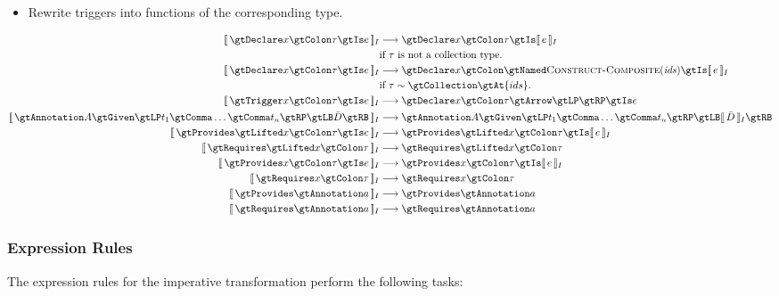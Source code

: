\documentclass[10pt]{article}
\begin{document}
\begin{itemize}
    \item Rewrite triggers into functions of the corresponding type.
\end{itemize}
%
\begin{adjustwidth}{-0.5in}{-0.5in}\begin{align*}
    \eqI{\gtDeclare x \gtColon \tau \gtIs e}
        {\gtDeclare x \gtColon \tau \gtIs \intI{e}}
        {if $\tau$ is not a collection type.} \\
    \eqI{\gtDeclare x \gtColon \tau \gtIs e}
        {\gtDeclare x \gtColon \gtNamed \ConstructComposite{ids} \gtIs \intI{e}}
        {if $\tau \sim \gtCollection \gtAt \{ids\}$.} \\
    \eqI{\gtTrigger x \gtColon \tau \gtIs e}
        {\gtDeclare x \gtColon \tau \gtArrow \gtLP \gtRP \gtIs e}
        {} \\
    \eqI{\gtAnnotation A \gtGiven \gtLP t_1 \gtComma \ldots \gtComma t_n \gtRP \gtLB \bar{D} \gtRB}
        {\gtAnnotation A \gtGiven \gtLP t_1 \gtComma \ldots \gtComma t_n \gtRP \gtLB \intI{\bar{D}} \gtRB}{} \\
    \eqI{\gtProvides \gtLifted x \gtColon \tau \gtIs e}
        {\gtProvides \gtLifted x \gtColon \tau \gtIs \intI{e}}{} \\
    \eqI{\gtRequires \gtLifted x \gtColon \tau}
        {\gtRequires \gtLifted x \gtColon \tau}{} \\
    \eqI{\gtProvides x \gtColon \tau \gtIs e}
        {\gtProvides x \gtColon \tau \gtIs \intI{e}}{} \\
    \eqI{\gtRequires x \gtColon \tau}
        {\gtRequires x \gtColon \tau}{} \\
    \eqI{\gtProvides \gtAnnotation a}
        {\gtProvides \gtAnnotation a}{} \\
    \eqI{\gtRequires \gtAnnotation a}
        {\gtRequires \gtAnnotation a}{}
\end{align*}\end{adjustwidth}

\subsubsection{Expression Rules}

The expression rules for the imperative transformation perform the following tasks:
\end{document}
